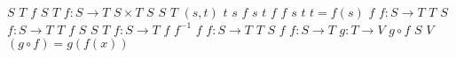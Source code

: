 \documentclass{article}
\begin{document}
$S$
$T$
$f$
$S$
$T$
$f:S \to T$
$S \times T$
$S$
$S$
$T$
$(s,t)$
$t$
$s$
$f$
$s$
$t$
$f$
$f$
$s$
$t$
$t = f(s)$
$f$
$f: S \to T$
$T$
$S$
$f: S \to T$
$T$
$f$
$S$
$S$
$T$
$f: S \to T$
$f$
$f^{-1}$
$f$
$f : S \to T$
$T$
$S$
$f$
$f : S \to T$
$g : T \to V$
$g \circ f$
$S$
$V$
$(g \circ f) = g(f(x))$
\end{document}
